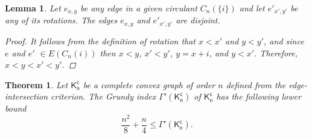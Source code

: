 \documentclass[11pt]{article}
\newtheorem{theorem}{Theorem}
\newtheorem{lemma}{Lemma}
\begin{document}
\begin{lemma}\label{lema:rotation}
Let $e_{x,y}$ be any edge in a given circulant $C_n(\{i\})$ and let $e'_{x',y'}$ be any of its rotations. The edges $e_{x,y}$ and $e'_{x',y'}$ are disjoint. 
\begin{proof}
It follows from the definition of rotation that $x < x'$ and $y < y'$, and since $e$ and $e'$ $\in E(C_n({i}))$ then $x < y$, $x' < y'$, $y = x + i$, and $y < x'$. Therefore, $x < y < x' < y'$.
\end{proof}
\end{lemma}


\begin{theorem}
Let $\mathsf{K^{c}_{n}}$ be a complete convex graph of order $n$ defined from the edge-intersection criterion. The Grundy index $\Gamma'(\mathsf{K^{c}_{n}})$ of $\mathsf{K^{c}_{n}}$ has the following lower bound $$\frac{n^2}{8} + \frac{n}{4} \leq \Gamma'(\mathsf{K^{c}_{n}}).$$
\end{theorem}\label{thm:convex_lower}
\end{document}
